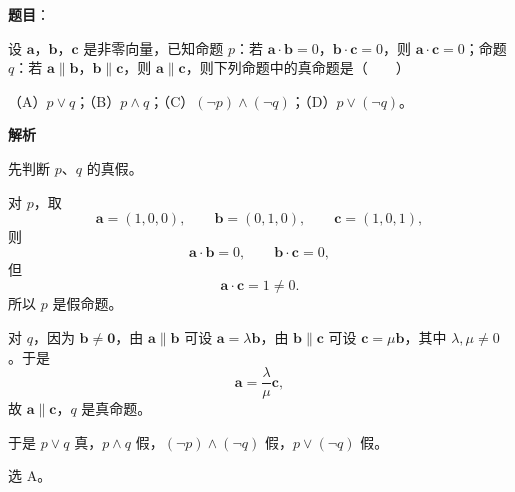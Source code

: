 \begin{answer}

\textbf{题目}：

设 $\boldsymbol a$，$\boldsymbol b$，$\boldsymbol c$ 是非零向量，已知命题 $p$：若 $\boldsymbol a\cdot\boldsymbol b=0$，$\boldsymbol b\cdot\boldsymbol c=0$，则 $\boldsymbol a\cdot\boldsymbol c=0$；命题 $q$：若 $\boldsymbol a\parallel\boldsymbol b$，$\boldsymbol b\parallel\boldsymbol c$，则 $\boldsymbol a\parallel\boldsymbol c$，则下列命题中的真命题是\mbox{（　　）}

（A）$p\vee q$；（B）$p\wedge q$；（C）$(\neg p)\wedge(\neg q)$；（D）$p\vee(\neg q)$。

\textbf{解析}

先判断 $p$、$q$ 的真假。

对 $p$，取
\nopagebreak[4]
\[\boldsymbol a=(1,0,0),\qquad \boldsymbol b=(0,1,0),\qquad \boldsymbol c=(1,0,1),\]
则
\nopagebreak[4]
\[\boldsymbol a\cdot\boldsymbol b=0,\qquad \boldsymbol b\cdot\boldsymbol c=0,\]
但
\nopagebreak[4]
\[\boldsymbol a\cdot\boldsymbol c=1\neq0.\]
所以 $p$ 是假命题。

对 $q$，因为 $\boldsymbol b\neq\boldsymbol 0$，由 $\boldsymbol a\parallel\boldsymbol b$ 可设 $\boldsymbol a=\lambda\boldsymbol b$，由 $\boldsymbol b\parallel\boldsymbol c$ 可设 $\boldsymbol c=\mu\boldsymbol b$，其中 $\lambda,\mu\neq0$。于是
\nopagebreak[4]
\[\boldsymbol a=\frac{\lambda}{\mu}\boldsymbol c,\]
故 $\boldsymbol a\parallel\boldsymbol c$，$q$ 是真命题。

于是 $p\vee q$ 真，$p\wedge q$ 假，$(\neg p)\wedge(\neg q)$ 假，$p\vee(\neg q)$ 假。

选 A。


\end{answer}
